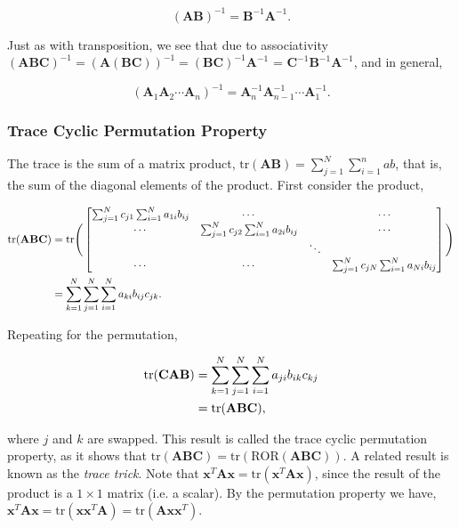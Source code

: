 \documentclass[11pt]{amsart}
\begin{document}
$$(\mathbf{AB})^{-1} = \mathbf{B}^{-1}\mathbf{A}^{-1}.$$

Just as with transposition, we see that due to associativity $(\mathbf{ABC})^{-1} = (\mathbf{A(BC)})^{-1} = (\mathbf{BC})^{-1}\mathbf{A}^{-1}$ = $\mathbf{C}^{-1}\mathbf{B}^{-1}\mathbf{A}^{-1}$, and in general,

$$(\mathbf{A}_1\mathbf{A}_2\cdots \mathbf{A}_n)^{-1} = \mathbf{A}_n^{-1}\mathbf{A}_{n-1}^{-1}\cdots\mathbf{A}_1^{-1}.$$

\subsubsection{Trace Cyclic Permutation Property}

The trace is the sum of a matrix product, $\text{tr}(\mathbf{A}\mathbf{B}) = \sum_{j=1}^N\sum_{i = 1}^n ab$, that is, the sum of the diagonal elements of the product. First consider the product,

\begin{align}
\text{tr}(\mathbf{A}\mathbf{B}\mathbf{C}) &= \text{tr}\Bigg(\begin{bmatrix}
\sum_{j=1}^N c_{j1}\sum_{i=1}^Na_{1i}b_{ij} & \cdots & & \cdots \\
\cdots & \sum_{j=1}^N c_{j2}\sum_{i=1}^Na_{2i}b_{ij} & & \cdots \\
 &  & \ddots & \\
\cdots & \cdots &&  \sum_{j=1}^N c_{jN}\sum_{i=1}^Na_{Ni}b_{ij} \\
\end{bmatrix}\Bigg) \notag \\
&= \sum_{k=1}^N\sum_{j=1}^N\sum_{i=1}^Na_{ki}b_{ij}c_{jk}. \notag
\end{align}

Repeating for the permutation,

\begin{align}
\text{tr}(\mathbf{C}\mathbf{A}\mathbf{B}) &= \sum_{k=1}^N\sum_{j=1}^N\sum_{i=1}^Na_{ji}b_{ik}c_{kj} \notag \\
&= \text{tr}(\mathbf{A}\mathbf{B}\mathbf{C}), \notag
\end{align}

where $j$ and $k$ are swapped. This result is called the trace cyclic permutation property, as it shows that $\text{tr}(\mathbf{A}\mathbf{B}\mathbf{C}) = \text{tr}(\text{ROR}(\mathbf{A}\mathbf{B}\mathbf{C}))$. A related result is known as the \emph{trace trick}. Note that $\mathbf{x}^T\mathbf{A}\mathbf{x} = \text{tr}(\mathbf{x}^T\mathbf{A}\mathbf{x})$, since the result of the product is a $1 \times 1$ matrix (i.e. a scalar). By the permutation property we have, $\mathbf{x}^T\mathbf{A}\mathbf{x} = \text{tr}(\mathbf{x}\mathbf{x}^T\mathbf{A}) = \text{tr}(\mathbf{A}\mathbf{x}\mathbf{x}^T)$.
\end{document}
